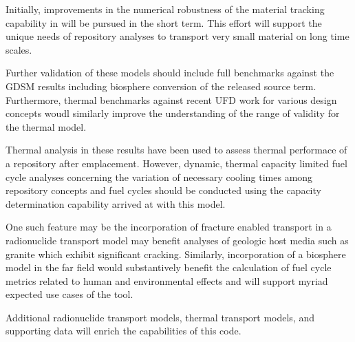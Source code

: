 Initially, improvements in the numerical robustness of the material tracking 
capability in \Cyclus will be pursued in the short term. This effort will 
support the unique needs of repository analyses to transport very small 
material on long time scales.  

Further validation of these models should include full benchmarks against the 
\gls{GDSM} results including biosphere conversion of the released source term. 
Furthermore, thermal benchmarks against recent \gls{UFD} work for various 
design concepts woudl similarly improve the understanding of the range of 
validity for the thermal model. 

Thermal analysis in these results have been used to assess thermal performace 
of a repository after emplacement. However, dynamic, thermal capacity limited 
fuel cycle analyses concerning the variation of necessary cooling times among 
repository concepts and fuel cycles should be conducted using the capacity 
determination capability arrived at with this model.  

One such feature may be the incorporation of fracture enabled transport in a 
radionuclide transport model may benefit analyses of geologic host media such as 
granite which exhibit significant cracking. Similarly, incorporation of a 
biosphere model in the far field would substantively benefit the calculation of 
fuel cycle metrics related to human and environmental effects and will support 
myriad expected use cases of the tool.

Additional radionuclide transport models, thermal transport models, and 
supporting data will enrich the capabilities of this code. 

